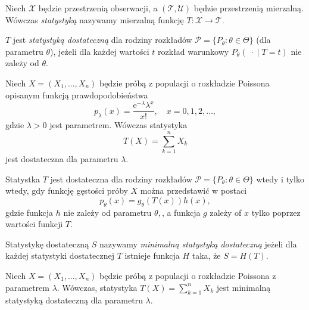 \begin{df}
	Niech $\mathcal{X}$ będzie przestrzenią obserwacji, a $(\mathcal{T}, \mathcal{U})$  będzie przestrzenią mierzalną.	
	Wówczas \textit{statystyką} nazywamy mierzalną funkcję $T: \mathcal{X} \to \mathcal{T}$.
\end{df}

\begin{df}
 $T$  jest \textit{statystyką dostateczną} dla rodziny rozkładów $\mathcal{P}=\{P_\theta : \theta \in \Theta\}$ (dla parametru $\theta$), jeżeli dla każdej wartości $t$ rozkład warunkowy $P_\theta(\; \cdot \; | \; T=t)$ nie zależy od $\theta$.
\end{df}

\begin{przyk}
	Niech $X = (X_1, \ldots, X_n)$ będzie próbą z populacji o rozkładzie Poissona opisanym funkcją prawdopodobieństwa
	\begin{equation*}
		p_{\lambda}(x) = \frac{\text{e}^{-\lambda}\lambda^x}{x!}, \quad x =0,1,2,\ldots,
	\end{equation*}
	gdzie $\lambda > 0$  jest parametrem. Wówczas statystyka
	\begin{equation*}
		T(X) = \sum_{k=1}^{n} X_k
	\end{equation*}
	jest dostateczna dla parametru $\lambda$.
\end{przyk}

\begin{tw} Statystka $T$ jest dostateczna dla rodziny rozkładów $\mathcal{P}=\{P_\theta : \theta \in \Theta\}$ wtedy i tylko wtedy, gdy funkcję gęstości próby $X$ można przedstawić w postaci 
	\begin{equation*}
		p_{\theta}(x) = g_{\theta}(T(x))h(x),
	\end{equation*}
	gdzie funkcja $h$ nie zależy od parametru $\theta,$, a funkcja $g$ zależy of $x$ tylko poprzez wartości funkcji $T$.
\end{tw}

\begin{df}
	Statystykę dostateczną $S$ nazywamy \textit{minimalną statystyką dostateczną} jeżeli dla każdej statystyki dostatecznej $T$ istnieje funkcja $H$ taka, że $S=H(T)$.
\end{df}

\begin{przyk}
	Niech $X = (X_1, \ldots, X_n)$ będzie próbą z populacji o rozkładzie Poissona z parametrem $\lambda$. Wówczas, statystyka $T(X) = \sum_{k=1}^{n} X_k$ jest minimalną statystyką dostateczną dla parametru $\lambda$. 
\end{przyk}

